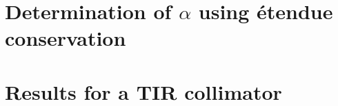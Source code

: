 
\section{Determination of $\alpha$ using \'{e}tendue conservation}
\section{Results for a TIR collimator}
% 
\label{sec:Tir_alpha}

